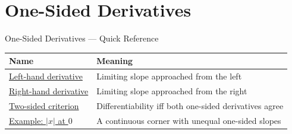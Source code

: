 \section{One-Sided Derivatives}

\begin{toolkitbox}{One-Sided Derivatives --- Quick Reference}
\small
\begin{tabular}{l l}
\toprule
\textbf{Name} & \textbf{Meaning} \\
\midrule
\hyperref[def:left-hand-derivative]{Left-hand derivative} & Limiting slope approached from the left \\
\hyperref[def:right-hand-derivative]{Right-hand derivative} & Limiting slope approached from the right \\
\hyperref[thm:differentiability-and-one-sided-derivatives]{Two-sided criterion} & Differentiability iff both one-sided derivatives agree \\
\hyperref[ex:abs-corner]{Example: \(|x|\) at \(0\)} & A continuous corner with unequal one-sided slopes \\
\bottomrule
\end{tabular}
\end{toolkitbox}


